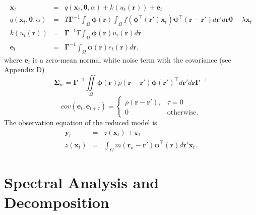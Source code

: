 \documentclass[onecolumn,draftcls]{IEEEtran}
\begin{document}
\begin{eqnarray}\label{Homogeneous SS Model}
	\mathbf{x}_t &=& q(\mathbf{x}_t,\boldsymbol{\theta},\alpha) + k\left(u_t\left(\mathbf{r}\right)\right) + \mathbf{e}_t \\
	q(\mathbf{x}_t,\boldsymbol{\theta},\alpha) &=& T\boldsymbol{\Gamma}^{ - 1}\int_\Omega {\boldsymbol{\phi}\left(\mathbf{r}\right) \int_\Omega {f\left(\boldsymbol{\phi}^{\top}\left(\mathbf{r}'\right)\mathbf{x}_t\right)\boldsymbol{\psi}^{\top} \left(\mathbf{r}-\mathbf{r}'\right)d\mathbf{r}'} d\mathbf{r}} \boldsymbol{\theta} - \lambda \mathbf{x}_t \\
	k(u_t(\mathbf{r})) &=& \boldsymbol{\Gamma}^{-1}T \int_\Omega{\boldsymbol{\phi} \left(\mathbf{r}\right) u_t\left(\mathbf{r}\right)d\mathbf{r}} \\
	\mathbf{e}_t &=& \boldsymbol{\Gamma}^{-1}\int_\Omega{\boldsymbol{\phi}\left(\mathbf{r}\right)e_t\left(\mathbf{r}\right)d\mathbf{r}},
\end{eqnarray}
where $\mathbf{e}_t$ is a zero-mean normal white noise term with the covariance (see Appendix D)
\begin{equation} 
\boldsymbol{\Sigma}_w=\boldsymbol{\Gamma}^{-1}\iint\limits_{\Omega}\boldsymbol{\phi}\left(\mathbf r\right) \rho\left(\mathbf{r}- \mathbf{r}' \right)\boldsymbol{\phi}\left(\mathbf{r}'\right)^{\top}d\mathbf{r}' d\mathbf{r}\boldsymbol{\Gamma}^{- \top} 
\end{equation}
\begin{equation}
 cov(\mathbf{e}_t,\mathbf{e}_{t+\tau})=
\begin{cases}
\rho\left(\mathbf{r}-\mathbf{r'}\right), & \tau=0 \\
0 & \mathrm{otherwise}.
\end{cases}
\label{eq:FieldCovariance}
\end{equation}
The observation equation of the reduced model is
\begin{eqnarray}\label{ObservationEquation}
    \mathbf{y}_t &=& z\left(\mathbf{x}_t\right) + \boldsymbol{\varepsilon}_t \\
	z\left(\mathbf{x}_t\right) &=& \int_\Omega m\left(\mathbf{r}_n-\mathbf{r}'\right)\boldsymbol{\phi}^{\top}\left(\mathbf{r}\right) d\mathbf{r}' \mathbf{x}_t.
\end{eqnarray}

\section{Spectral Analysis and Decomposition}
\end{document}
